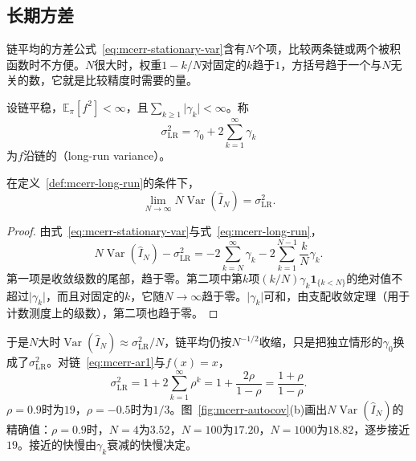 \subsection{长期方差}
\label{sec:mcerr-long-run}

链平均的方差公式~\eqref{eq:mcerr-stationary-var}含有$N$个项，比较两条链或两个被积函数时不方便。$N$很大时，权重$1-k/N$对固定的$k$趋于$1$，方括号趋于一个与$N$无关的数，它就是比较精度时需要的量。

\begin{definition}[长期方差]
\label{def:mcerr-long-run}
设链平稳，$\mathbb{E}_{\pi}[f^{2}]<\infty$，且$\sum_{k\geq1}\lvert\gamma_k\rvert<\infty$。称
\begin{equation}
 \sigma_{\mathrm{LR}}^{2}=\gamma_0+2\sum_{k=1}^{\infty}\gamma_k
 \label{eq:mcerr-long-run}
\end{equation}
为$f$沿链的（long-run variance）。
\end{definition}

\begin{theorem}[方差的极限]
\label{thm:mcerr-long-run-limit}
在定义~\ref{def:mcerr-long-run}的条件下，
\begin{equation}
 \lim_{N\to\infty}N\operatorname{Var}(\hat{I}_N)=\sigma_{\mathrm{LR}}^{2} .
 \label{eq:mcerr-nvar-limit}
\end{equation}
\end{theorem}

\begin{proof}
由式~\eqref{eq:mcerr-stationary-var}与式~\eqref{eq:mcerr-long-run}，
\[
 N\operatorname{Var}(\hat{I}_N)-\sigma_{\mathrm{LR}}^{2}=-2\sum_{k=N}^{\infty}\gamma_k-2\sum_{k=1}^{N-1}\frac{k}{N}\gamma_k .
\]
第一项是收敛级数的尾部，趋于零。第二项中第$k$项$(k/N)\gamma_k\mathbf{1}_{\{k<N\}}$的绝对值不超过$\lvert\gamma_k\rvert$，而且对固定的$k$，它随$N\to\infty$趋于零。$\lvert\gamma_k\rvert$可和，由支配收敛定理（用于计数测度上的级数），第二项也趋于零。
\end{proof}

于是$N$大时$\operatorname{Var}(\hat{I}_N)\approx\sigma_{\mathrm{LR}}^{2}/N$，链平均仍按$N^{-1/2}$收缩，只是把独立情形的$\gamma_0$换成了$\sigma_{\mathrm{LR}}^{2}$。对链~\eqref{eq:mcerr-ar1}与$f(x)=x$，
\[
 \sigma_{\mathrm{LR}}^{2}=1+2\sum_{k=1}^{\infty}\rho^{k}=1+\frac{2\rho}{1-\rho}=\frac{1+\rho}{1-\rho} .
\]
$\rho=0.9$时为$19$，$\rho=-0.5$时为$1/3$。图~\ref{fig:mcerr-autocov}(b)画出$N\operatorname{Var}(\hat{I}_N)$的精确值：$\rho=0.9$时，$N=4$为$3.52$，$N=100$为$17.20$，$N=1000$为$18.82$，逐步接近$19$。接近的快慢由$\gamma_k$衰减的快慢决定。

